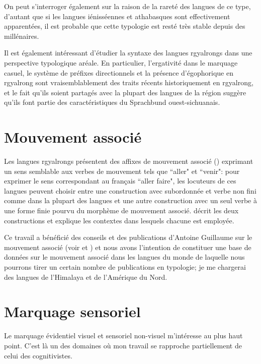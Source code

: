 \documentclass[oldfontcommands,oneside,a4paper,11pt]{memoir}
\begin{document}
On peut s'interroger également sur la raison de la rareté des langues de ce type, d'autant que si les langues iénisséennes et athabasques sont effectivement apparentées, il est probable que cette typologie est resté très stable depuis des millénaires.

 
Il est également intéressant d'étudier la syntaxe des langues rgyalrongs dans une perspective typologique aréale. En particulier,  l'ergativité dans le marquage casuel, le système de préfixes directionnels  et la présence d'égophorique en rgyalrong sont vraisemblablement des traits récents historiquement en rgyalrong, et le fait qu'ils soient partagés avec la plupart des langues de la région suggère qu'ils font partie  des caractéristiques du Sprachbund ouest-sichuanais.

\section{Mouvement associé}
Les langues rgyalrongs  présentent des affixes de mouvement associé (\citealt{jacques13harmonization}) exprimant un sens semblable aux verbes de mouvement tels que ``aller" et ``venir": pour exprimer le sens correspondant au français ``aller faire", les locuteurs de ces langues peuvent choisir entre une construction avec subordonnée et verbe non fini comme dans la plupart des langues et une autre construction avec un seul verbe à une forme finie pourvu du morphème de mouvement associé. \citet{jacques13harmonization} décrit les deux constructions et explique les contextes dans lesquels chacune  est employée. 

Ce travail a bénéficié des conseils et des publications d'Antoine Guillaume sur le mouvement associé (voir \citealt{guillaume.associated.motion} et \citealt{guillaume09mouv.assoc}) et nous avons l'intention de constituer une base de données sur le mouvement associé dans les langues du monde de laquelle nous pourrons tirer un certain nombre de publications en typologie; je me chargerai des langues de l'Himalaya et de l'Amérique du Nord.



\section{Marquage sensoriel}
Le marquage évidentiel visuel et sensoriel non-visuel m'intéresse au plus haut point. C'est là un des domaines où mon travail se rapproche partiellement de celui des cognitivistes.
\end{document}

